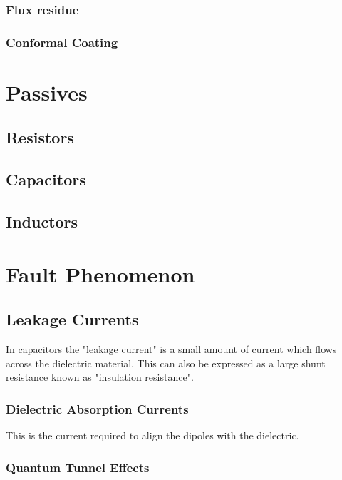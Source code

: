 \documentclass{article}
\begin{document}
		\subsubsection{Flux residue}
		\subsubsection{Conformal Coating}

\newpage

\section{Passives}
	\subsection{Resistors}
	
	\subsection{Capacitors}
	
	\subsection{Inductors}
	
\newpage

\section{Fault Phenomenon}
	\subsection{Leakage Currents}
	In capacitors the "leakage current" is a small amount of current which flows across the dielectric material. This can also be expressed as a large shunt resistance known as "insulation resistance".
	
	\subsubsection{Dielectric Absorption Currents}
	This is the current required to align the dipoles with the dielectric.
	
	\subsubsection{Quantum Tunnel Effects}


\newpage

\printbibliography
\end{document}
